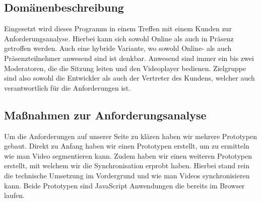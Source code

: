 \subsection{Domänenbeschreibung}
    Eingesetzt wird dieses Programm in einem Treffen mit einem Kunden zur Anforderungsanalyse.
    Hierbei kann sich sowohl Online als auch in Präsenz getroffen werden. Auch eine hybride Variante,
    wo sowohl Online- als auch Präsenzteilnehmer anwesend sind ist denkbar. 
    Anwesend sind immer ein bis zwei Moderatoren, die die Sitzung leiten und den Videoplayer bedienen.
	Zielgruppe sind also sowohl die Entwickler als auch der Vertreter des Kundens, welcher auch verantwortlich für die Anforderungen ist.
\subsection{Maßnahmen zur Anforderungsanalyse}
    Um die Anforderungen auf unserer Seite zu klären haben wir mehrere Prototypen gebaut.
    Direkt zu Anfang haben wir einen Prototypen erstellt, um zu ermitteln wie man Video segmentieren kann.
    Zudem haben wir einen weiteren Prototypen erstellt, mit welchem wir die Synchronisation erprobt haben.
    Hierbei stand rein die technische Umsetzung im Vordergrund und wie man Videos synchronisieren kann.
    Beide Prototypen sind JavaScript Anwendungen die bereits im Browser laufen.
